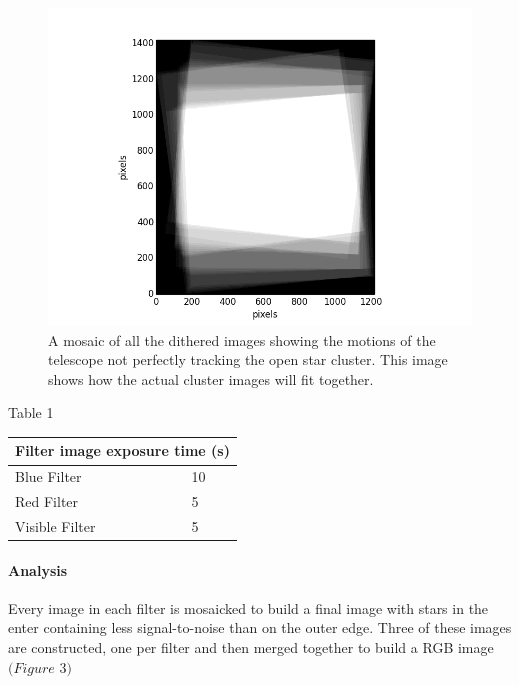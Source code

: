 \documentclass[11pt,twocolumn]{article}
\begin{document}
\begin{center}
\begin{figure}
\includegraphics[scale=0.5]{figure_2}
\caption{\small{A mosaic of all the dithered images showing the motions of the telescope not perfectly tracking the open star cluster. This image shows how the actual cluster images will fit together. }}
\end{figure}
\end{center}


\begin{center}
Table 1
\end{center}
\begin{center}
\begin{tabular}{|l|l|}
\hline
\multicolumn{2}{|c|}{Filter image exposure time (s)} \\
\hline
Blue Filter & 10 \\
Red Filter & 5 \\
Visible Filter & 5 \\
\hline
\end{tabular}
\end{center}

\paragraph{Analysis}

Every image in each filter is mosaicked to build a final image with stars in the enter containing less signal-to-noise than on the outer edge. Three of these images are constructed, one per filter and then merged together to build a RGB image $(Figure$ $3)$
\end{document}
